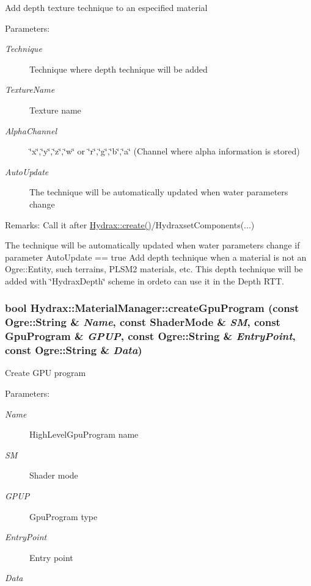 \begin{CompactItemize}
Add depth texture technique to an especified material \begin{Desc}
\item[Parameters:]
\begin{description}
\item[{\em Technique}]Technique where depth technique will be added \item[{\em TextureName}]Texture name \item[{\em AlphaChannel}]\char`\"{}x\char`\"{},\char`\"{}y\char`\"{},\char`\"{}z\char`\"{},\char`\"{}w\char`\"{} or \char`\"{}r\char`\"{},\char`\"{}g\char`\"{},\char`\"{}b\char`\"{},\char`\"{}a\char`\"{} (Channel where alpha information is stored) \item[{\em AutoUpdate}]The technique will be automatically updated when water parameters change \end{description}
\end{Desc}
\begin{Desc}
\item[Remarks:]Call it after \hyperlink{class_hydrax_1_1_hydrax_af840e19208614533a6b344e32965ee2}{Hydrax::create()}/HydraxsetComponents(...)\end{Desc}
The technique will be automatically updated when water parameters change if parameter AutoUpdate == true Add depth technique when a material is not an Ogre::Entity, such terrains, PLSM2 materials, etc. This depth technique will be added with \char`\"{}HydraxDepth\char`\"{} scheme in ordeto can use it in the Depth RTT. \hypertarget{class_hydrax_1_1_material_manager_c0f7c351a7df142a04023c3409d6d871}{
\subsubsection[{createGpuProgram}]{\setlength{\rightskip}{0pt plus 5cm}bool Hydrax::MaterialManager::createGpuProgram (const Ogre::String \& {\em Name}, \/  const {\bf ShaderMode} \& {\em SM}, \/  const {\bf GpuProgram} \& {\em GPUP}, \/  const Ogre::String \& {\em EntryPoint}, \/  const Ogre::String \& {\em Data})}}
\label{class_hydrax_1_1_material_manager_c0f7c351a7df142a04023c3409d6d871}


Create GPU program \begin{Desc}
\item[Parameters:]
\begin{description}
\item[{\em Name}]HighLevelGpuProgram name \item[{\em SM}]Shader mode \item[{\em GPUP}]GpuProgram type \item[{\em EntryPoint}]Entry point \item[{\em Data}]\end{description}
\end{Desc}
\hypertarget{class_hydrax_1_1_material_manager_6aa7b0a92b824348577d506f7bcf581b}{
}
\end{CompactItemize}
